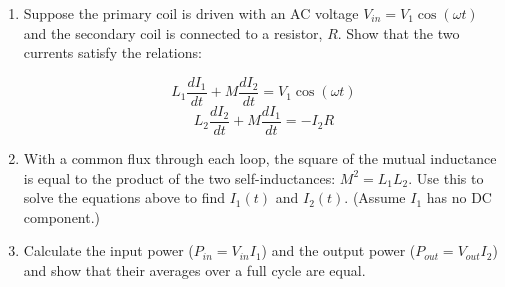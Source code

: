 \begin{enumerate}
    \begin{enumerate}

      \item Suppose the primary coil is driven with an AC voltage $V_{in}=V_1\cos(\omega t)$ and the secondary coil is connected to a resistor, $R$. Show that the two currents satisfy the relations:

        $$L_1\frac{dI_1}{dt}+M\frac{dI_2}{dt}=V_1\cos(\omega t)$$
        $$L_2\frac{dI_2}{dt}+M\frac{dI_1}{dt}=-I_2R$$

      \item  With a common flux through each loop, the square of the mutual inductance is equal to the product of the two self-inductances: $M^2 =L_1L_2$. Use this to solve the equations above to find $I_1(t)$ and $I_2(t)$. (Assume $I_1$ has no DC component.)

      \item Calculate the input power ($P_{in}=V_{in}I_1$) and the output power ($P_{out}=V_{out}I_2$) and show that their averages over a full cycle are equal.

    \end{enumerate}

\end{enumerate}



